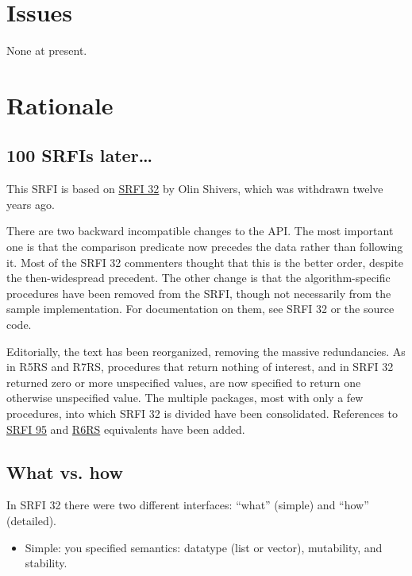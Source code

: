 \section{Issues}\label{issues}

None at present.

\section{Rationale}\label{rationale}

\subsection{100 SRFIs later\ldots{}}\label{srfis-later}

This SRFI is based on
\href{http://srfi.schemers.org/srfi-32/srfi-32.txt}{SRFI 32} by Olin
Shivers, which was withdrawn twelve years ago.

There are two backward incompatible changes to the API. The most
important one is that the comparison predicate now precedes the data
rather than following it. Most of the SRFI 32 commenters thought that
this is the better order, despite the then-widespread precedent. The
other change is that the algorithm-specific procedures have been removed
from the SRFI, though not necessarily from the sample implementation.
For documentation on them, see SRFI 32 or the source code.

Editorially, the text has been reorganized, removing the massive
redundancies. As in R5RS and R7RS, procedures that return nothing of
interest, and in SRFI 32 returned zero or more unspecified values, are
now specified to return one otherwise unspecified value. The multiple
packages, most with only a few procedures, into which SRFI 32 is divided
have been consolidated. References to
\href{http://srfi.schemers.org/srfi-95/srfi-95.html}{SRFI 95} and
\href{http://www.r6rs.org/final/html/r6rs-lib/r6rs-lib-Z-H-5.html\#node_chap_4}{R6RS}
equivalents have been added.

\subsection{What vs. how}\label{Whatvs.how}

In SRFI 32 there were two different interfaces: ``what'' (simple) and
``how'' (detailed).

\begin{itemize}
\tightlist
\item
  Simple: you specified semantics: datatype (list or vector),
  mutability, and stability.
\end{itemize}


